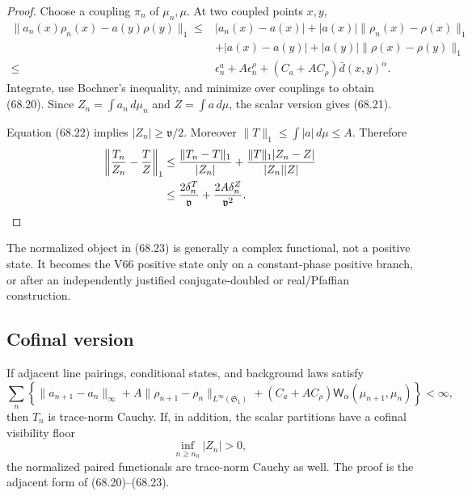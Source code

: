\documentclass[11pt]{article}
\theoremstyle{remark}
\begin{document}
\begin{proof}
Choose a coupling \(\pi_n\) of \(\mu_n,\mu\).  At two coupled points
\(x,y\),
\begin{align}
 \|a_n(x)\rho_n(x)-a(y)\rho(y)\|_1
 \leq{}&
 |a_n(x)-a(x)|
 +|a(x)|\|\rho_n(x)-\rho(x)\|_1                  \nonumber\\
 &+|a(x)-a(y)|
 +|a(y)|\|\rho(x)-\rho(y)\|_1                    \nonumber\\
 \leq{}&
 \epsilon_n^a+A\epsilon_n^\rho
 +(C_a+AC_\rho)\bar d(x,y)^\alpha.                \tag{68.24}
\end{align}
Integrate, use Bochner's inequality, and minimize over couplings to
obtain (68.20).  Since
\(Z_n=\int a_n\,d\mu_n\) and \(Z=\int a\,d\mu\), the scalar version
gives (68.21).

Equation (68.22) implies \(|Z_n|\geq\mathfrak v/2\).  Moreover
\(\|T\|_1\leq\int|a|\,d\mu\leq A\).  Therefore
\begin{align*}
 \left\|{T_n\over Z_n}-{T\over Z}\right\|_1
 &\leq
 {\|T_n-T\|_1\over|Z_n|}
 +
 {\|T\|_1|Z_n-Z|\over|Z_n||Z|}\\
 &\leq
 {2\delta_n^T\over\mathfrak v}
 +
 {2A\delta_n^Z\over\mathfrak v^2}.
\end{align*}
\end{proof}

The normalized object in (68.23) is generally a complex functional,
not a positive state.  It becomes the V66 positive state only on a
constant-phase positive branch, or after an independently justified
conjugate-doubled or real/Pfaffian construction.

\subsection{Cofinal version}

If adjacent line pairings, conditional states, and background laws
satisfy
\begin{equation}
 \sum_n
 \left\{
 \|a_{n+1}-a_n\|_\infty
 +A\|\rho_{n+1}-\rho_n\|_{L^\infty({\mathfrak S}_1)}
 +(C_a+AC_\rho)
 {\mathsf W}_\alpha(\mu_{n+1},\mu_n)
 \right\}
 <\infty,                                         \tag{68.25}
\end{equation}
then \(T_n\) is trace-norm Cauchy.  If, in addition, the scalar
partitions have a cofinal visibility floor
\begin{equation}
                         \inf_{n\geq n_0}|Z_n|>0, \tag{68.26}
\end{equation}
the normalized paired functionals are trace-norm Cauchy as well.
The proof is the adjacent form of (68.20)--(68.23).
\end{document}
